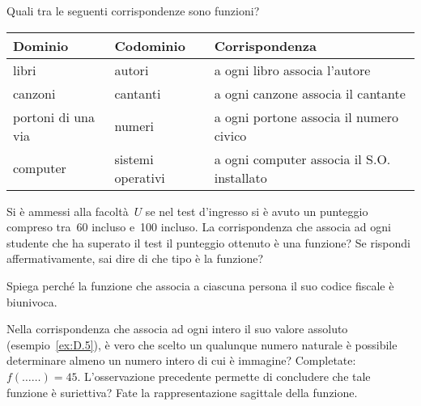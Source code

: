 \begin{esercizio}
 \label{ese:D.4}
Quali tra le seguenti corrispondenze sono funzioni?
\begin{center}
 \begin{tabular}{*3{l}}
 \toprule
  Dominio & Codominio & Corrispondenza\\
\midrule
libri & autori & a ogni libro associa l'autore\\
canzoni & cantanti & a ogni canzone associa il cantante\\
portoni di una via & numeri & a ogni portone associa il numero civico\\
computer & sistemi operativi & a ogni computer associa il S.O. installato\\
\bottomrule
 \end{tabular}
\end{center}
\end{esercizio}

\begin{esercizio}
 \label{ese:D.5}
Si è ammessi alla facoltà~\(U\) se nel test
d'ingresso si è avuto un punteggio compreso tra~60
incluso e~100 incluso. La corrispondenza che associa ad ogni studente
che ha superato il test il punteggio ottenuto è una funzione? Se rispondi
affermativamente, sai dire di che tipo è la funzione?
\end{esercizio}


\begin{esercizio}
 \label{ese:D.6}
Spiega perché la funzione che associa a ciascuna
persona il suo codice fiscale è biunivoca.
\end{esercizio}


\begin{esercizio}
 \label{ese:D.7}
Nella corrispondenza che associa ad ogni intero il suo valore assoluto 
(esempio~\ref{ex:D.5}), è vero che scelto un qualunque numero naturale è
possibile determinare almeno un numero intero di cui è immagine?
Completate:~\(f({\ldots}{\ldots}) = 45.\)
L'osservazione precedente permette di concludere che
tale funzione è suriettiva?
Fate la rappresentazione sagittale della funzione.
\end{esercizio}

